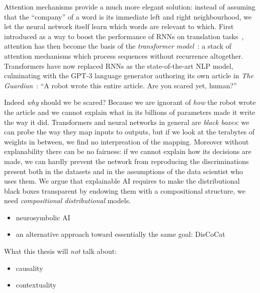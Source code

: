 Attention mechanisms provide a much more elegant solution: instead of assuming that the ``company'' of a word is its immediate left and right neighbourhood, we let the neural network itself learn which words are relevant to which.
First introduced as a way to boost the performance of RNNs on translation tasks~\cite{BahdanauEtAl16}, attention has then become the basis of the \emph{transformer model}~\cite{VaswaniEtAl17}: a stack of attention mechanisms which process sequences without recurrence altogether.
Transformers have now replaced RNNs as the state-of-the-art NLP model, culminating
with the GPT-3 language generator authoring its own article in \emph{The Guardian}~\cite{GPT-320}:
\linebreak
``A robot wrote this entire article. Are you scared yet, human?''

Indeed \emph{why} should we be scared?
Because we are ignorant of \emph{how} the robot wrote the article and we cannot explain what in its billions of parameters made it write the way it did.
Transformers and neural networks in general are \emph{black boxes}: we can probe the way they map inputs to outputs, but if we look at the terabytes of weights in between, we find no interpreation of the mapping.
Moreover without explanability there can be no fairness: if we cannot explain how its decisions are made, we can hardly prevent the network from reproducing the discriminations present both in the datasets and in the assumptions of the data scientist who uses them.
We argue that explainable AI requires to make the distributional black boxes transparent by endowing them with a compositional structure, we need \emph{compositional distributional} models.

\begin{itemize}
    \item neurosymbolic AI
    \item an alternative approach toward essentially the same goal: DisCoCat
\end{itemize}

What this thesis will \emph{not} talk about:

\begin{itemize}
    \item causality
    \item contextuality
\end{itemize}
